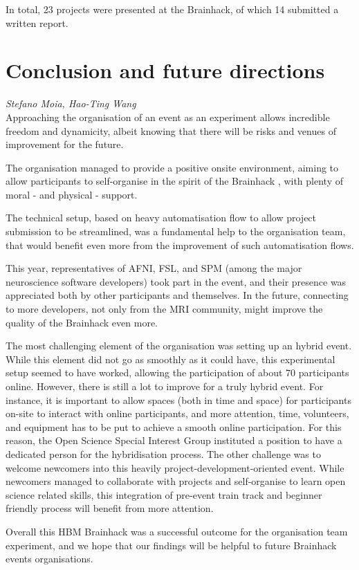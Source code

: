 \documentclass[10pt,a4paper,twocolumns]{proc}
\newcommand{\authors}[1]{\emph{\footnotesize #1} \\}
\begin{document}
In total, 23 projects were presented at the Brainhack, of which 14 submitted a written
report.
















\section{Conclusion and future directions}
\authors{Stefano Moia, %
Hao-Ting Wang}
%

Approaching the organisation of an event as an experiment allows
incredible freedom and dynamicity, albeit knowing that there will be
risks and venues of improvement for the future.

The organisation managed to provide a positive onsite environment,
aiming to allow participants to self-organise in the spirit of the
Brainhack \parencite{Gau2021}, with plenty of moral - and physical - support.

The technical setup, based on heavy automatisation flow to allow project
submission to be streamlined, was a fundamental help to the organisation
team, that would benefit even more from the improvement of such
automatisation flows.

This year, representatives of AFNI, FSL, and SPM (among the major
neuroscience software developers) took part in the event, and their
presence was appreciated both by other participants and themselves. In
the future, connecting to more developers, not only from the MRI
community, might improve the quality of the Brainhack even more.

The most challenging element of the organisation was setting up an
hybrid event. While this element did not go as smoothly as it could
have, this experimental setup seemed to have worked, allowing the
participation of about 70 participants online. However, there is still a
lot to improve for a truly hybrid event. For instance, it is important
to allow spaces (both in time and space) for participants on-site to
interact with online participants, and more attention, time, volunteers,
and equipment has to be put to achieve a smooth online participation.
For this reason, the Open Science Special Interest Group instituted a
position to have a dedicated person for the hybridisation process. The
other challenge was to welcome newcomers into this heavily
project-development-oriented event. While newcomers managed to
collaborate with projects and self-organise to learn open science
related skills, this integration of pre-event train track and beginner
friendly process will benefit from more attention.

Overall this HBM Brainhack was a successful outcome for the organisation
team experiment, and we hope that our findings will be helpful to future
Brainhack events organisations.

\printbibliography
\end{document}
